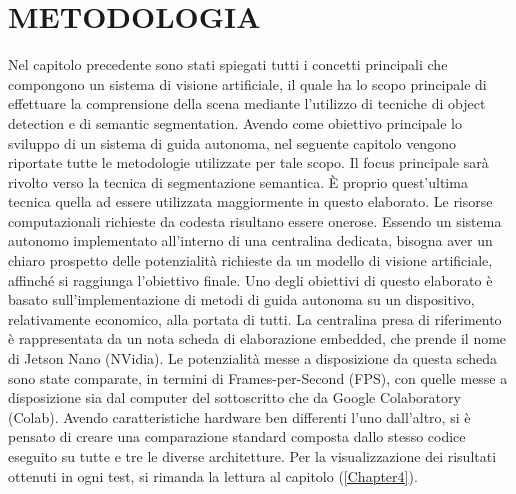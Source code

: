 
\chapter{METODOLOGIA}
\label{Capitolo3}
\thispagestyle{empty}

Nel capitolo precedente sono stati spiegati tutti i concetti principali che 
compongono un sistema di visione artificiale, il quale ha lo scopo principale 
di effettuare la comprensione della scena mediante l'utilizzo di tecniche 
di object detection e di semantic segmentation. Avendo come obiettivo 
principale lo sviluppo di un sistema di guida autonoma, nel seguente capitolo 
vengono riportate tutte le metodologie utilizzate per tale scopo. Il focus 
principale sarà rivolto verso la tecnica di segmentazione semantica. È 
proprio quest'ultima tecnica quella ad essere utilizzata maggiormente in 
questo elaborato. Le risorse computazionali richieste da codesta risultano 
essere onerose. Essendo un sistema autonomo implementato all'interno di 
una centralina dedicata, bisogna aver un chiaro prospetto delle potenzialità 
richieste da un modello di visione artificiale, affinché si raggiunga l'obiettivo 
finale. Uno degli obiettivi di questo elaborato è basato sull'implementazione 
di metodi di guida autonoma su un dispositivo, relativamente economico, 
alla portata di tutti. La centralina presa di riferimento è rappresentata da 
un nota scheda di elaborazione embedded, che prende il nome di Jetson 
Nano (NVidia). Le potenzialità messe a disposizione da questa scheda sono 
state comparate, in termini di Frames-per-Second (FPS), con quelle messe 
a disposizione sia dal computer del sottoscritto che da Google Colaboratory 
(Colab). Avendo caratteristiche hardware ben differenti l'uno dall'altro, si è 
pensato di creare una comparazione standard composta dallo stesso codice 
eseguito su tutte e tre le diverse architetture. Per la visualizzazione dei 
risultati ottenuti in ogni test, si rimanda la lettura al capitolo (\ref{Chapter4}).

